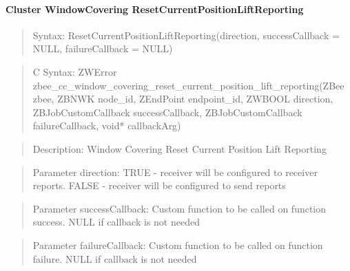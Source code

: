 \paragraph{Cluster WindowCovering ResetCurrentPositionLiftReporting}
\begin{quote}Syntax: ResetCurrentPositionLiftReporting(direction, successCallback = NULL, failureCallback = NULL)\end{quote}
\begin{quote}C Syntax: ZWError zbee\_cc\_window\_covering\_reset\_current\_position\_lift\_reporting(ZBee zbee, ZBNWK node\_id, ZEndPoint endpoint\_id, ZWBOOL direction, ZBJobCustomCallback successCallback, ZBJobCustomCallback failureCallback, void* callbackArg)\end{quote}
\begin{quote}Description: Window Covering Reset Current Position Lift Reporting\end{quote}
\begin{quote}Parameter direction: TRUE  - receiver will be configured to receiver reports. FALSE - receiver will be configured to send reports\end{quote}
\begin{quote}Parameter successCallback: Custom function to be called on function success. NULL if callback is not needed\end{quote}
\begin{quote}Parameter failureCallback: Custom function to be called on function failure. NULL if callback is not needed\end{quote}


